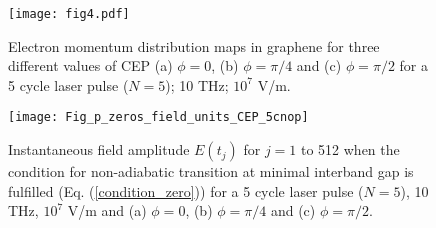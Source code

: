 \documentclass[9pt,twocolumn,twoside]{osajnl}
\begin{document}
\begin{figure}
\centering
\texttt{[image: fig4.pdf]}
             \caption{Electron momentum distribution maps in graphene for three different values of CEP (a) $\phi=0$, (b) $\phi=\pi/4$ and (c) $\phi=\pi/2$ for a 5 cycle laser pulse ($N=5$); 10 THz;  $10^7$ V/m. }\label{fig_momentum_5cycles}
\end{figure}
\begin{figure}
\texttt{[image: Fig\_p\_zeros\_field\_units\_CEP\_5cnop]}
\caption{Instantaneous field amplitude $E(t_j)$ for $j=1$ to 512 when the condition for non-adiabatic transition at minimal interband gap is fulfilled (Eq. (\ref{condition_zero})) for a 5 cycle laser pulse ($N=5$), 10 THz,  $10^7$ V/m  and (a) $\phi=0$, (b) $\phi=\pi/4$ and (c) $\phi=\pi/2$.}
\label{fig_p_asym_CEP_5cnop}
\end{figure}
\end{document}
